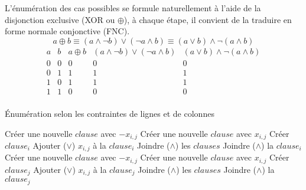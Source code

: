 \documentclass[a4paper,12pt]{report}
\begin{document}
L'énumération des cas possibles se formule naturellement à l'aide de la disjonction exclusive (XOR ou $\oplus$), à chaque étape, il convient de la traduire en forme normale conjonctive (FNC).
$$ a\oplus b \equiv (a \wedge \lnot b)\vee(\lnot a \wedge b) \equiv (a\vee b)\wedge\lnot(a\wedge b)$$
\begin{displaymath}
\begin{array}{c|c|c|c|c}
   a
 & b
 & a \oplus b
 & (a\land{}\lnot{}b)\lor{}(\lnot{}a\land{}b)
  & (a\lor{}b)\land{}\lnot{}(a\land{}b) \\
\hline
0 & 0 & 0 & 0 & 0 \\
0 & 1 & 1 & 1 & 1 \\
1 & 0 & 1 & 1 & 1 \\
1 & 1 & 0 & 0 & 0 \\

\end{array}
\end{displaymath}

\begin{algorithm}
\caption{Énumération selon les contraintes de lignes et de colonnes}
\begin{algorithmic}
				\State Créer une nouvelle $clause$ avec $-x_{i,j}$
			\EndIf
				\State Créer une nouvelle $clause$ avec $x_{i,j}$
			\EndIf
				 \State Créer $clause_i$
				\EndIf
				\State	Ajouter ($\vee$) $x_{i,j}$ à la $clause_i$ 
			\EndIf
		\State Joindre ($\wedge$) les $clauses$
		\EndFor
			\State Joindre ($\wedge$) la $clause_i$
		\EndIf
\EndFor
{}		
				\State Créer une nouvelle $clause$ avec $-x_{i,j}$
			\EndIf
				\State Créer une nouvelle $clause$ avec $x_{i,j}$
			\EndIf
				 \State Créer $clause_j$
				\EndIf
				\State	Ajouter ($\vee$) $x_{i,j}$ à la $clause_j$ 
			\EndIf
		\State Joindre ($\wedge$) les $clauses$
		\EndFor
			\State Joindre ($\wedge$) la $clause_j$
		\EndIf
\EndFor
\end{algorithmic}
\end{algorithm}


	
						
\end{document}
